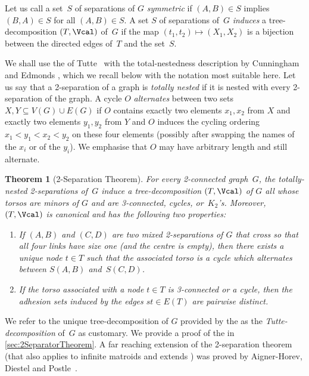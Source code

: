 \documentclass{aic}
\newcommand{\se}{\subseteq}
\theoremstyle{plain}
\newtheorem{thm}{Theorem}[section]
\theoremstyle{definition}
\theoremstyle{plain}
\theoremstyle{plain}
\begin{document}
Let us call a set~$S$ of separations of $G$ \emph{symmetric} if $(A,B)\in S$ implies $(B,A)\in S$ for 
all $(A,B)\in S$.
A set $S$ of separations of~$G$ \emph{induces} a tree-decomposition $(T,\Vcal)$ of~$G$ if the map $(t_1,t_2)\mapsto (X_1,X_2)$ is a bijection between the directed edges of~$T$ and the set~$S$.

We shall use the  of Tutte~\cite{TutteGrTh} with the total-nestedness description by Cunningham and Edmonds 
\cite{cunningham_edmonds_1980}, which we recall below with the notation most suitable here.
Let us say that a 2-separation of a graph is \emph{totally nested} if it is nested with every 2-separation of the graph.
A cycle $O$ \emph{alternates} between two sets $X,Y\se V(G)\cup E(G)$ if $O$ contains exactly two elements $x_1,x_2$ from $X$ and exactly two elements $y_1,y_2$ from $Y$ and $O$ induces the cycling ordering $x_1 < y_1 < x_2 < y_2$ on these four elements (possibly after swapping the names of the $x_i$ or of the $y_i$).
We emphasise that $O$ may have arbitrary length and still alternate.

\begin{thm}[2-Separation Theorem]\label{2SeparatorTheorem}
For every 2-connected graph~$G$, the totally-nested 2-separa\-tions of~$G$ induce a tree-decomposition 
$(T,\Vcal)$ of $G$ all whose torsos are minors of $G$ and are 3-connected, cycles, or~$K_2$'s.
Moreover, $(T,\Vcal)$ is canonical and has the following two properties:
\begin{enumerate}
    \item If $(A,B)$ and $(C,D)$ are two mixed 2-separations of $G$ that cross so that all four links have size one (and the centre is empty), then there exists a unique node $t\in T$ such that the associated torso is a cycle which alternates between $S(A,B)$ and~$S(C,D)$.
    \item If the torso associated with a node $t\in T$ is 3-connected or a cycle, then the adhesion sets induced by the edges $st\in E(T)$ are pairwise distinct.
\end{enumerate}
\end{thm}
We refer to the unique tree-decomposition of $G$ provided by the  as the \emph{Tutte-decomposition} of~$G$ as customary.
We provide a proof of the  in \autoref{sec:2SeparatorTheorem}.
A far reaching extension of the 2-separation theorem (that also applies to infinite matroids and extends \cite{infiniteSPQR,richter2004decomposing}) was proved by  Aigner-Horev, Diestel and Postle~\cite{Matroid2seps}.
\end{document}
